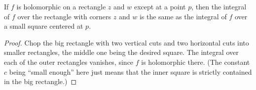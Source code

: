 \begin{lemma}[RectanglePullToNhdOfPole]
\label{RectanglePullToNhdOfPole}
\leanok
If $f$ is holomorphic on a rectangle $z$ and $w$ except at
  a point $p$, then the integral of $f$ over the rectangle
  with corners $z$ and $w$ is the same as the integral of $f$
  over a small square centered at $p$.
\end{lemma}
\begin{proof}
\leanok
Chop the big rectangle with two vertical cuts and two
  horizontal cuts into smaller rectangles, the middle one
  being the desired square. The integral over each of the
  outer rectangles vanishes, since $f$ is holomorphic there.
  (The constant $c$ being ``small enough'' here just means
  that the inner square is strictly contained in the big
  rectangle.)
\end{proof}
